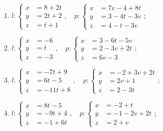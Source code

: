 	\vspace{10pt}
	\begin{enumerate}
		\setcounter{enumi}{\value{tasks}}

			\item \( l: \left\lbrace \begin{aligned}
						x &= 8+2t \\
						y &= 2t+2 \\
						z &= t+1
					\end{aligned} \right., \quad p: \left\lbrace \begin{aligned}
						x &= 7v-4+8t \\
						y &= 3-4t-3v \\
						z &= 4-t-3v
					\end{aligned} \right. \);
			\item \( l: \left\lbrace \begin{aligned}
						x &= -6 \\
						y &= t \\
						z &= -3
					\end{aligned} \right., \quad p: \left\lbrace \begin{aligned}
						x &= 3-6t-5v \\
						y &= 2-3v+2t \\
						z &= 6v-3
					\end{aligned} \right. \);
			\item \( l: \left\lbrace \begin{aligned}
						x &= -7t+9 \\
						y &= 6t-5 \\
						z &= -11t+8
					\end{aligned} \right., \quad p: \left\lbrace \begin{aligned}
						x &= -2+3v+2t \\
						y &= 2v+1 \\
						z &= 2-3t
					\end{aligned} \right. \);
			\item \( l: \left\lbrace \begin{aligned}
						x &= 8t-5 \\
						y &= -9t+4 \\
						z &= -1+6t
					\end{aligned} \right., \quad p: \left\lbrace \begin{aligned}
						x &= -2+t \\
						y &= -1-2v+2t \\
						z &= 2+v
					\end{aligned} \right. \);

\end{enumerate}
